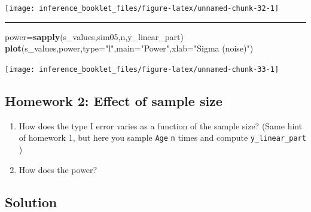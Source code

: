 \documentclass[]{article}
\newenvironment{Shaded}{\begin{snugshade}}{\end{snugshade}}
\newcommand{\KeywordTok}[1]{\textcolor[rgb]{0.13,0.29,0.53}{\textbf{#1}}}
\newcommand{\DataTypeTok}[1]{\textcolor[rgb]{0.13,0.29,0.53}{#1}}
\newcommand{\StringTok}[1]{\textcolor[rgb]{0.31,0.60,0.02}{#1}}
\newcommand{\NormalTok}[1]{#1}
\begin{document}
\begin{center}\texttt{[image: inference\_booklet\_files/figure-latex/unnamed-chunk-32-1]} \end{center}

\begin{center}\rule{0.5\linewidth}{\linethickness}\end{center}

\begin{Shaded}
\begin{Highlighting}[]
\NormalTok{power=}\KeywordTok{sapply}\NormalTok{(s_values,sim05,n,y_linear_part)}
\KeywordTok{plot}\NormalTok{(s_values,power,}\DataTypeTok{type=}\StringTok{"l"}\NormalTok{,}\DataTypeTok{main=}\StringTok{"Power"}\NormalTok{,}\DataTypeTok{xlab=}\StringTok{"Sigma (noise)"}\NormalTok{)}
\end{Highlighting}
\end{Shaded}

\begin{center}\texttt{[image: inference\_booklet\_files/figure-latex/unnamed-chunk-33-1]} \end{center}

\subsection{Homework 2: Effect of sample
size}\label{homework-2-effect-of-sample-size}

\begin{enumerate}
\def\labelenumi{\arabic{enumi}.}
\item
  How does the type I error varies as a function of the sample size?
  (Same hint of homework 1, but here you sample \texttt{Age} \texttt{n}
  times and compute \texttt{y\_linear\_part} )
\item
  How does the power?
\end{enumerate}

\subsection{Solution}\label{solution-1}
\end{document}
